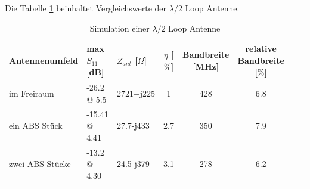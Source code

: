 
Die Tabelle \ref{tab:Evaluation_Vergeich_Loop_Antennen_Lmabda05} beinhaltet Vergleichswerte der $\lambda/2$ Loop Antenne.
\begin{table}[!h]
 \centering
 \begin{tabular}{p{3cm} p{3cm} l c c c c r} 
 \toprule 
 Antennenumfeld 	& max $S_{11}$ [dB]		& $Z_{ant}$ [$\Omega$] 	& $\eta$ [$\%$] & Bandbreite [MHz] & relative Bandbreite [$\%$]\\ 
 \midrule
im Freiraum 		&	-26.2 @ 5.5	& 	2721+j225	& 1		&	428 & 6.8\\ 					 		
ein ABS Stück 	& -15.41 @ 4.41 	&	27.7-j433	& 2.7	&	350 & 7.9 \\
zwei ABS Stücke & -13.2 @ 4.30 	&	24.5-j379	& 3.1	&	278 & 6.2\\
 \bottomrule
 \end{tabular}
 \caption{Simulation einer $\lambda/2$ Loop Antenne }
 \label{tab:Evaluation_Vergeich_Loop_Antennen_Lmabda05}
\end{table}

